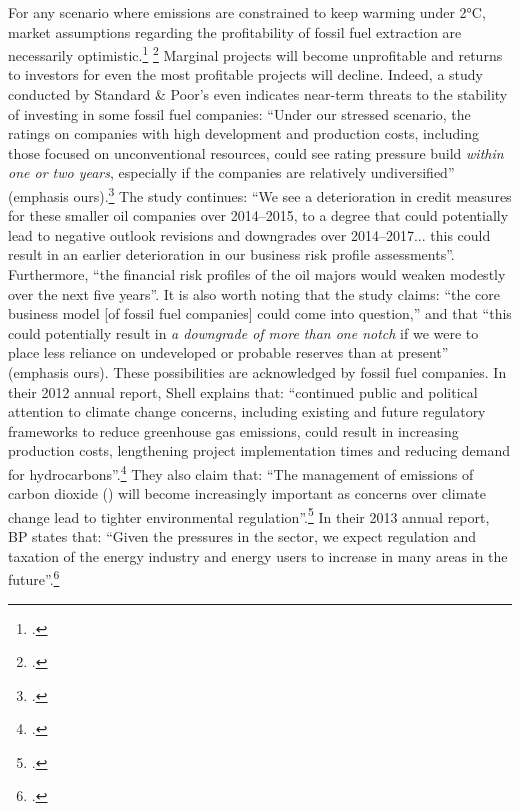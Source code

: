 \documentclass[10pt]{article}
\begin{document}
For any scenario where emissions are constrained to keep warming under 2°C, market assumptions regarding the profitability of fossil fuel extraction are necessarily optimistic.\footcite[See: ][]{Kiesel2013} \footcite[][]{Yonavjak2013}
Marginal projects will become unprofitable and returns to investors for even the most profitable projects will decline. 
Indeed, a study conducted by Standard \& Poor's even indicates near-term threats to the stability of investing in some fossil fuel companies: ``Under our stressed scenario, the ratings on companies with high development and production costs, including those focused on unconventional resources, could see rating pressure build \emph{within one or two years}, especially if the companies are relatively undiversified'' (emphasis ours).\footcite{SandPConstrained}
The study continues: ``We see a deterioration in credit measures for these smaller oil companies over 2014--2015, to a degree that could potentially lead to negative outlook revisions and downgrades over 2014--2017... this could result in an earlier deterioration in our business risk profile assessments''.
Furthermore, ``the financial risk profiles of the oil majors would weaken modestly over the next five years''.
It is also worth noting that the study claims: ``the core business model [of fossil fuel companies] could come into question,'' and that ``this could potentially result in \emph{a downgrade of more than one notch} if we were to place less reliance on undeveloped or probable reserves than at present'' (emphasis ours).
These possibilities are acknowledged by fossil fuel companies.
In their 2012 annual report, Shell explains that: ``continued public and political attention to climate change concerns, including existing and future regulatory frameworks to reduce greenhouse gas emissions, could result in increasing production costs, lengthening project implementation times and reducing demand for hydrocarbons''.\footcite[][p. 14]{ShellAnnualReport2012}
They also claim that: ``The management of emissions of carbon dioxide () will become increasingly important as concerns over climate change lead to tighter environmental regulation''.\footcite[][p. 47]{ShellAnnualReport2012}
In their 2013 annual report, BP states that: ``Given the pressures in the sector, we expect regulation and taxation of the energy industry and energy users to increase in many areas in the future''.\footcite[][p. 12]{BPAnnualReport2013}
\end{document}
